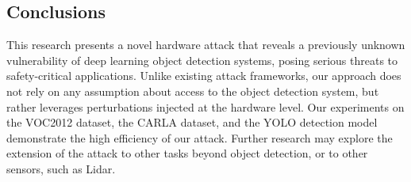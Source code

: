 



\subsection{Conclusions}


This research presents a novel hardware attack that reveals a previously unknown vulnerability of deep learning object detection systems, posing serious threats to safety-critical applications. Unlike existing attack frameworks, our approach does not rely on any assumption about access to the object detection system, but rather leverages perturbations injected at the hardware level. Our experiments on the VOC2012 dataset, the CARLA dataset, and the YOLO detection model demonstrate the high efficiency of our attack. Further research may explore the extension of the attack to other tasks beyond object detection, or to other sensors, such as Lidar.






